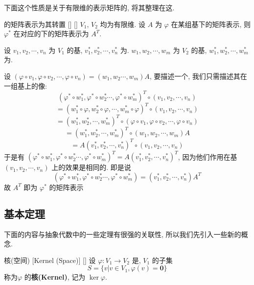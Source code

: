 \documentclass[UTF8]{ctexart}
\DeclareMathOperator{\0}{\mathbf{0}}
\DeclareMathOperator{\<}{\langle}
\renewcommand{\>}{\rangle}
\begin{document}
        
            下面这个性质是关于有限维 的表示矩阵的, 将其整理在这.
            \begin{ppt}
                []
                { 的矩阵表示为其转置}
                []
                []
                 \(V_1\),  \(V_2\) 均为有限维. 设 \(A\) 为 \(\varphi\)  在某组基下的矩阵表示, 则 \(\varphi^*\) 在对应的 下的矩阵表示为 \(A^T\).
            \end{ppt}

            \begin{prf}
                设 \(v_1,v_2,\cdots,v_n\) 为 \(V_1\) 的基,  \(v_1^*, v_2^*,\cdots,v_n^*\)  为. 
                 \(w_1,w_2,\cdots,w_m\) 为 \(V_2\) 的基,  \(w_1^*, w_2^*,\cdots, w_m^*\) 为. 
                
                设 \((\varphi\circ v_1,\varphi\circ v_2,\cdots,\varphi\circ v_n)=(w_1,w_2\cdots,w_m)A\), 
                要描述一个, 我们只需描述其在一组基上的像:
                \[(\varphi^*\circ w_1^*,\varphi^*\circ w_2^*\cdots,\varphi^*\circ w_m^*)^T\circ(v_1,v_2,\cdots,v_n)\]
                \[=(w_1^*\circ\varphi,w_2^*\circ\varphi,\cdots,w_m^*\circ\varphi)^T\circ(v_1,v_2,\cdots,v_n)\]
                \[=(w_1^*,w_2^*,\cdots,w_m^*)^T\circ(\varphi\circ v_1,\varphi\circ v_2,\cdots,\varphi\circ v_n)\]
                \[=(w_1^*,w_2^*,\cdots,w_m^*)^T\circ(w_1,w_2,\cdots,w_m)A\]
                \[=A(v_1^*,v_2^*,\cdots,v_n^*)^T\circ(v_1,v_2,\cdots,v_n)\]
                于是有 \((\varphi^*\circ w_1^*,\varphi^*\circ w_2^*\cdots,\varphi^*\circ w_m^*)^T=A(v_1^*,v_2^*,\cdots,v_n^*)^T\), 
                因为他们作用在基 \((v_1,v_2,\cdots,v_n)\) 上的效果是相同的. 即是说
                \[(\varphi^*\circ w_1^*,\varphi^*\circ w_2^*\cdots,\varphi^*\circ w_m^*)=(v_1^*,v_2^*,\cdots,v_n^*)A^T\]
                故 \(A^T\) 即为 \(\varphi^*\) 的矩阵表示
            \end{prf}
            
        
		
	
	\subsection{ 基本定理}
	下面的内容与抽象代数中的一些定理有很强的关联性, 所以我们先引入一些新的概念.
		\begin{dfn}
			[]
			{核(空间)}
			[Kernel (Space)]
			[]
			设 \(\varphi:V_1\to V_2\) 是,  \(V_1\) 的子集\[S=\{v|v\in V_1,\varphi(v)=\mathbf{0}\}\]称为 \(\varphi\) 的\textbf{核(Kernel)}, 记为 \(\ker\varphi\). 
		\end{dfn}
  
\end{document}
